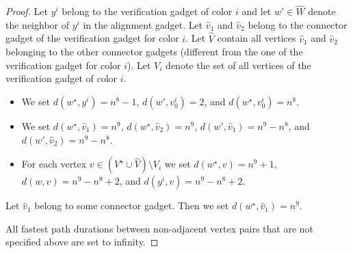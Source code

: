 \documentclass[a4paper,UKenglish,cleveref, autoref, thm-restate, anonymous]{lipics-v2021}
\begin{document}
\begin{proof}
Let $y^i$ belong to the verification gadget of color $i$ and let $w'\in \hat{W}$ denote the neighbor of $y^i$ in the alignment gadget. Let $\hat{v}_1$ and $\hat{v}_2$ belong to the connector gadget of the verification gadget for color $i$. Let $\hat{V}$ contain all vertices $\hat{v}_1$ and $\hat{v}_2$ belonging to the other connector gadgets (different from the one of the verification gadget for color $i$). Let $V_i$ denote the set of all vertices of the verification gadget of color $i$.
\begin{itemize}
    \item We set $d(w^\star,y^i)=n^8-1$, $d(w',v^i_0)=2$, and $d(w^\star,v^i_0)=n^8$.
    \item We set $d(w^\star,\hat{v}_1)=n^9$, $d(w^\star,\hat{v}_2)=n^9$, $d(w',\hat{v}_1)=n^9-n^8$, and $d(w',\hat{v}_2)=n^9-n^8$.
    \item For each vertex $v\in (V^\star\cup \hat{V})\setminus V_i$ we set $d(w^\star,v)=n^9+1$, $d(w,v)=n^9-n^8+2$, and $d(y^i,v)=n^9-n^8+2$.
\end{itemize}
Let $\hat{v}_1$ belong to some connector gadget. Then we set $d(w^\star,\hat{v}_1)=n^9$.

All fastest path durations between non-adjacent vertex pairs that are not specified above are set to infinity.



\end{proof}
\end{document}
